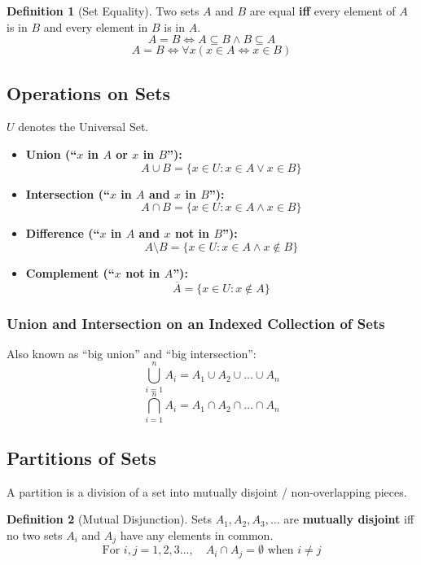 \documentclass{article}
\theoremstyle{plain}
\theoremstyle{definition}
\newtheorem*{definition}{Definition}
\theoremstyle{remark}
\begin{document}
\begin{definition}[Set Equality]
    Two sets $A$ and $B$ are equal \textbf{iff} every element of $A$ is in $B$ and every element in $B$ is in $A$.
    \[A = B \Leftrightarrow A \subseteq B \wedge B \subseteq A\]
    \[A = B \Leftrightarrow \forall x (x \in A \Leftrightarrow x \in B)\]
\end{definition}

\subsection{Operations on Sets}
$U$ denotes the Universal Set.

\begin{itemize}
    \item \textbf{Union (``$x$ in $A$ or $x$ in $B$''):} 
    \[A \cup B = \{x \in U : x \in A \vee x \in B\}\]
    
    \item \textbf{Intersection (``$x$ in $A$ and $x$ in $B$''):} 
    \[A \cap B = \{x \in U : x \in A \wedge x \in B\}\]
    
    \item \textbf{Difference (``$x$ in $A$ and $x$ not in $B$''):} 
    \[A \setminus B = \{x \in U : x \in A \wedge x \notin B\}\]
    
    \item \textbf{Complement (``$x$ not in $A$''):} 
    \[\overline{A} = \{x \in U : x \notin A\}\]
\end{itemize}

\subsubsection{Union and Intersection on an Indexed Collection of Sets}
Also known as ``big union'' and ``big intersection'':
\[\bigcup_{i=1}^n A_i = A_1 \cup A_2 \cup \dots \cup A_n\]
\[\bigcap_{i=1}^n A_i = A_1 \cap A_2 \cap \dots \cap A_n\]

\subsection{Partitions of Sets}
A partition is a division of a set into mutually disjoint / non-overlapping pieces.

\begin{definition}[Mutual Disjunction]
    Sets $A_1, A_2, A_3, \dots$ are \textbf{mutually disjoint} iff no two sets $A_i$ and $A_j$ have any elements in common.
    \[\text{For } i,j = 1, 2, 3 \dots, \quad A_i \cap A_j = \emptyset \text{ when } i \neq j\]
\end{definition}
\end{document}

